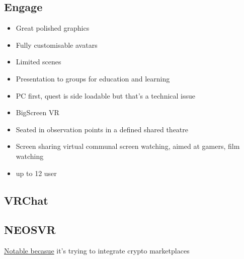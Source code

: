 \subsection{Engage}
\begin{itemize}
\item Great polished graphics
\item Fully customisable avatars
\item Limited scenes
\item Presentation to groups for education and learning
\item PC first, quest is side loadable but that's a technical issue
\item BigScreen VR
\item Seated in observation points in a defined shared theatre
\item Screen sharing virtual communal screen watching, aimed at gamers, film watching
\item up to 12 user
\end{itemize}
\subsection{VRChat}
\subsection{NEOSVR}
\href{https://neos.com/}{Notable becasue} it's trying to integrate crypto marketplaces
